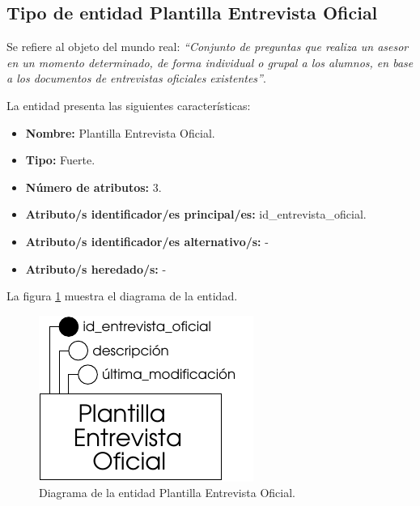 \subsection{Tipo de entidad Plantilla Entrevista Oficial}

   \begin{description}

   \item[Definición] Se refiere al objeto del mundo real: \emph{``Conjunto de
   preguntas que realiza un asesor en un momento determinado, de forma
   individual o grupal a los alumnos, en base a los documentos de entrevistas
   oficiales existentes''}.

   \item[Características] La entidad presenta las siguientes características:
      \begin{itemize}
         \item \textbf{Nombre:} Plantilla Entrevista Oficial.
         \item \textbf{Tipo:} Fuerte.
         \item \textbf{Número de atributos:} 3.
         \item \textbf{Atributo/s identificador/es principal/es:} id\_entrevista\_oficial.
         \item \textbf{Atributo/s identificador/es alternativo/s:} -
         \item \textbf{Atributo/s heredado/s:} -
      \end{itemize}

   \item[Diagrama] La figura \ref{diagramaPlantEntOfi} muestra el diagrama de la entidad.
   \item \begin{figure}[!ht]
            \begin{center}
            \includegraphics[]{07.Modelo_Entidad-Interrelacion/7.2.Analisis_Entidades/diagramas/plant_ent_ofi.pdf}
            \caption{Diagrama de la entidad Plantilla Entrevista Oficial.}
            \label{diagramaPlantEntOfi}
            \end{center}
         \end{figure}


\end{description}
